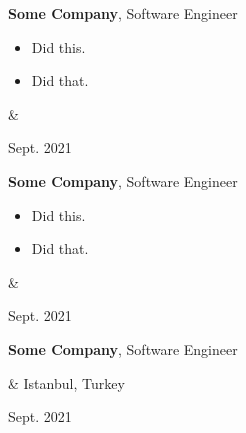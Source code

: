 \documentclass[10pt, letterpaper]{article}
\newenvironment{highlights}{
        \begin{itemize}[
                topsep=0pt,
                parsep=0.10 cm,
                partopsep=0pt,
                itemsep=0pt,
                after=\vspace{-1\baselineskip},
                leftmargin=0.4 cm + 3pt
            ]
    }{
        \end{itemize}
    } %
\let\originalTabularx\tabularx
\let\originalEndTabularx\endtabularx
\renewenvironment{tabularx}{\bgroup\centering\originalTabularx}{\originalEndTabularx\par\egroup}
\begin{document}
        \vspace{0.2 cm}
        \begin{tabularx}{
            \textwidth-0.4 cm-0.13cm
        }{
            K{0.2 cm}
            R{4.1 cm}
        }
            \textbf{Some Company}, Software Engineer

            \vspace{0.10 cm}

            \begin{highlights}
                \item Did this.
                \item Did that.
            \end{highlights}
            &
            

            Sept. 2021
        \end{tabularx}

        \vspace{0.2 cm}
        \begin{tabularx}{
            \textwidth-0.4 cm-0.13cm
        }{
            K{0.2 cm}
            R{4.1 cm}
        }
            \textbf{Some Company}, Software Engineer

            \vspace{0.10 cm}

            \begin{highlights}
                \item Did this.
                \item Did that.
            \end{highlights}
            &
            

            Sept. 2021
        \end{tabularx}

        \vspace{0.2 cm}
        \begin{tabularx}{
            \textwidth-0.4 cm-0.13cm
        }{
            K{0.2 cm}
            R{4.1 cm}
        }
            \textbf{Some Company}, Software Engineer

            \vspace{0.10 cm}

            &
            Istanbul, Turkey

            Sept. 2021
        \end{tabularx}
\end{document}
